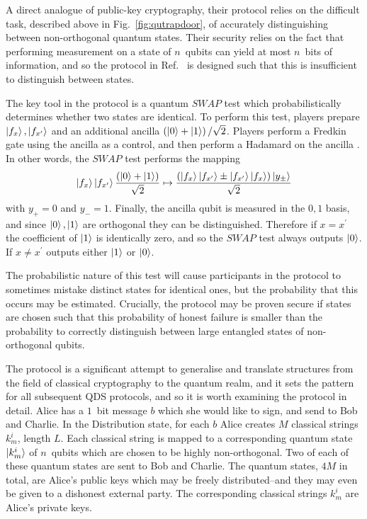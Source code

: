 
A direct analogue of public-key cryptography, their protocol relies on the difficult task, described above in Fig.~\ref{fig:qutrapdoor}, of accurately distinguishing between non-orthogonal quantum states. Their security relies on the fact that performing measurement on a state of $n$~qubits can yield at most $n$~bits of information, and so the protocol in Ref.~\cite{Gottesman2001} is designed such that this is insufficient to distinguish between states.

The key tool in the protocol is a quantum $SWAP$ test which probabilistically determines whether two states are identical. To perform this test, players prepare $\ket{f_x}, \ket{f_{x^\prime}}$ and an additional ancilla $\left(\ket{0} + \ket{1}\right)/\sqrt{2}$. Players perform a Fredkin gate using the ancilla as a control, and then perform a Hadamard on the ancilla \cite{Nielsen2010, brendon_book}. In other words, the $SWAP$ test performs the mapping %
\begin{equation}
\ket{f_x}\ket{f_{x^\prime}}\frac{\left(\ket{0} + \ket{1}\right)}{\sqrt{2}} \mapsto \frac{\left(\ket{f_x}\ket{f_{x^\prime}} \pm \ket{f_{x^\prime}}\ket{f_x}\right)\ket{y_{\pm}}}{\sqrt{2}}
\end{equation}
with $y_+=0$ and $y_-=1$. Finally, the ancilla qubit is measured in the $0, 1$ basis, and since $\ket{0}, \ket{1}$ are orthogonal they can be distinguished.  Therefore if $x = x^\prime$ the coefficient of $\ket{1}$ is identically zero, and so the $SWAP$ test always outputs $\ket{0}$. If $x \ne x^\prime$ outputs either $\ket{1}$ or $\ket{0}$. 

The probabilistic nature of this test will cause participants in the protocol to sometimes mistake distinct states for identical ones, but the probability that this occurs may be estimated. Crucially, the protocol may be proven secure if states are chosen such that this probability of honest failure is smaller than the probability to correctly distinguish between large entangled states of non-orthogonal qubits. 

The protocol is a significant attempt to generalise and translate structures from the field of classical cryptography to the quantum realm, and it sets the pattern for all subsequent QDS protocols, and so it is worth examining the protocol in detail. Alice has a $1$~bit message $b$ which she would like to sign, and send to Bob and Charlie. In the Distribution state, for each $b$ Alice creates $M$ classical strings $k_m^i$, length $L$. Each classical string is mapped to a corresponding quantum state $\ket{k_m^i}$ of $n$~qubits which are chosen to be highly non-orthogonal. Two of each of these quantum states are sent to Bob and Charlie. The quantum states, $4M$ in total, are Alice's public keys which may be freely distributed--and they may even be given to a dishonest external party. The corresponding classical strings $k_m^i$ are Alice's private keys.

